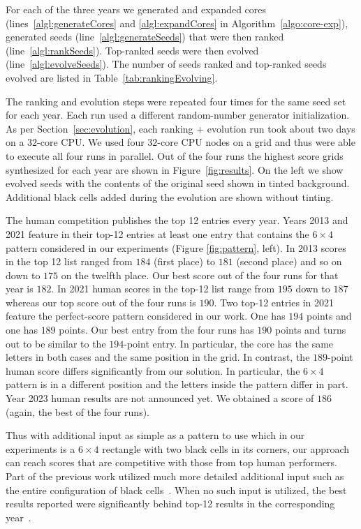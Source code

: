 For each of the three years we generated and expanded cores (lines~\ref{algl:generateCores} and \ref{algl:expandCores} in Algorithm~\ref{algo:core-exp}), generated seeds (line~\ref{algl:generateSeeds}) that were then ranked (line~\ref{algl:rankSeeds}). Top-ranked seeds were then evolved (line~\ref{algl:evolveSeeds}). The number of seeds ranked and top-ranked seeds evolved are listed in Table~\ref{tab:rankingEvolving}.


The ranking and evolution steps were repeated four times for the same seed set for each year. Each run used a different random-number generator initialization. As per Section~\ref{sec:evolution}, each ranking + evolution run took about two days on a $32$-core CPU. We used four $32$-core CPU nodes on a grid and thus were able to execute all four runs in parallel. Out of the four runs the highest score grids synthesized for each year are shown in Figure~\ref{fig:results}. On the left we show evolved seeds with the contents of the original seed shown in tinted background. Additional black cells added during the evolution are shown without tinting.

The human competition publishes the top 12 entries every year. Years 2013 and 2021 feature in their top-12 entries at least one entry that contains the $6 \times 4$ pattern considered in our experiments (Figure \ref{fig:pattern}, left). In 2013 scores in the top 12 list ranged from $184$ (first place) to $181$ (second place) and so on down to $175$ on the twelfth place. Our best score out of the four runs for that year is $182$. In 2021 human scores in the top-12 list range from $195$ down to $187$ whereas our top score out of the four runs is $190$. Two top-12 entries in 2021 feature the perfect-score pattern considered in our work. One has $194$ points and one has $189$ points. Our best entry from the four runs has $190$ points and turns out to be similar to the $194$-point entry. In particular, the core has the same letters in both cases and the same position in the grid. In contrast, the $189$-point human score differs significantly from our solution. In particular, the $6 \times 4$ pattern is in a different position and the letters inside the pattern differ in part. Year 2023 human results are not announced yet. We obtained a score of $186$ (again, the best of the four runs).

Thus with additional input as simple as a pattern to use which in our experiments is a $6 \times 4$ rectangle with two black cells in its corners, our approach can reach scores that are competitive with those from top human performers. Part of the previous work utilized much more detailed additional input such as the entire configuration of black cells~\cite{DBLP:conf/socs/BoteaB21}. When no such input is utilized, the best results reported were significantly behind top-12 results in the corresponding
year~\cite{DBLP:conf/cig/BulitkoB21,Botea_Bulitko_2022}.


